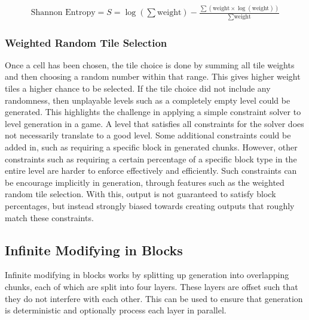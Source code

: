 \begin{align}
    \label{shannonEntropy}
    \text{Shannon Entropy}=S=\log(\sum{\text{weight}}) - \frac{\sum\left(\text{weight} \times \log(\text{weight})\right)}{\sum{\text{weight}}}
\end{align}


\subsubsection{Weighted Random Tile Selection}
Once a cell has been chosen, the tile choice is done by summing all tile weights and then choosing a random number within that range. This gives higher weight tiles a higher chance to be selected. If the tile choice did not include any randomness, then unplayable levels such as a completely empty level could be generated. This highlights the challenge in applying a simple constraint solver to level generation in a game. A level that satisfies all constraints for the solver does not necessarily translate to a good level. Some additional constraints could be added in, such as requiring a specific block in generated chunks. However, other constraints such as requiring a certain percentage of a specific block type in the entire level are harder to enforce effectively and efficiently. Such constraints can be encourage implicitly in generation, through features such as the weighted random tile selection. With this, output is not guaranteed to satisfy block percentages, but instead strongly biased towards creating outputs that roughly match these constraints.%


\subsection{Infinite Modifying in Blocks}
\label{sec:IMIB}
Infinite modifying in blocks works by splitting up generation into overlapping chunks, each of which are split into four layers. These layers are offset such that they do not interfere with each other. This can be used to ensure that generation is deterministic and optionally process each layer in parallel.%

